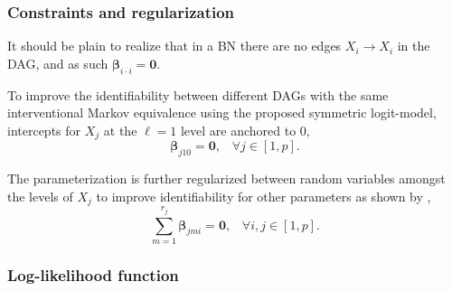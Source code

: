 \documentclass[twoside,11pt]{article}
\let\mbf\mathbf
\begin{document}
\subsubsection{Constraints and regularization}

It should be plain to realize that in a BN there are no edges $X_i\rightarrow X_i$ in the DAG, and as such $\bm\beta_{i\cdot i} = \mbf 0$.

To improve the identifiability between different DAGs with the same interventional Markov equivalence using the proposed symmetric logit-model, intercepts for $X_j$ at the $\ell=1$ level are anchored to $0$, \begin{equation*}
    \bm\beta_{j 1 0}=\bm 0,\;\;\; \forall{j}\in[1,p].
\end{equation*}

\noindent The parameterization is further regularized between random variables amongst the levels of $X_j$ to improve identifiability for other parameters as shown by \cite{friedman2010},%
\begin{equation*}
    \sum_{m=1}^{r_j}\bm\beta_{jmi}=\bm 0,\;\;\;\forall{i,j}\in[1,p].
\end{equation*}

\subsubsection{Log-likelihood function}
\end{document}
